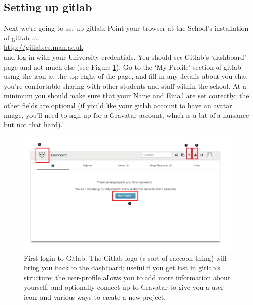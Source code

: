 \subsection{Setting up gitlab}

Next we're going to set up gitlab. Point your browser at the School's installation of gitlab at:
\\
\url{http://gitlab.cs.man.ac.uk}
\\
and log in with your University credentials. You should see Gitlab's `dashboard' page and not much else (see Figure \ref{figure:gitlab-first-login}). Go to the `My Profile' section of gitlab using the icon at the top right of the page, and fill in any details about you that you're comfortable sharing with other students and staff within the school. At a minimum you should make sure that your Name and Email are set correctly; the other fields are optional (if you'd like your gitlab account to have an avatar image, you'll need to sign up for a Gravatar account, which is a bit of a nuisance but not that hard). 

\begin{figure}
\centerline{\includegraphics[width=15cm]{images/gitlab-first-login}}
\caption{First login to Gitlab. \protect{} The Gitlab logo (a sort of raccoon thing) will bring you back to the dashboard; useful if you get lost in gitlab's structure; \protect{} the user-profile allows you to add more information about yourself, and optionally connect up to Gravatar to give you a user icon; and \protect{} various ways to create a new project.}\label{figure:gitlab-first-login}
\end{figure}

